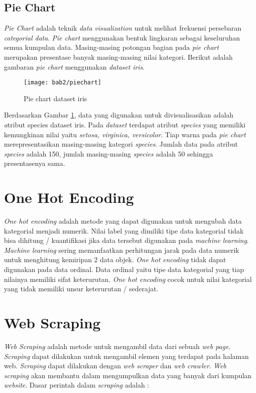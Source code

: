 \subsection{Pie Chart}
\textit{Pie Chart} adalah teknik \textit{data visualization} untuk melihat frekuensi persebaran \textit{categorial data}. \textit{Pie chart} menggunakan bentuk lingkaran sebagai keseluruhan semua kumpulan data. Masing-masing potongan bagian pada \textit{pie chart} merupakan presentase banyak masing-masing nilai kategori. Berikut adalah gambaran \textit{pie chart} menggunakan \textit{dataset iris}. 
	
	\begin{figure}[H]
		\centering  
		\texttt{[image: bab2/piechart]}   
		\caption{Pie chart dataset iris}
		\label{fig:piechart} 
	\end{figure}
	
Berdasarkan Gambar \ref{fig:piechart}, data yang digunakan untuk divisualisasikan adalah \textit atribut {species dataset iris}. Pada \textit{dataset} terdapat atribut \textit{species} yang memiliki kemungkinan nilai yaitu \textit{setosa, virginica, versicolor}. Tiap warna pada \textit{pie chart} merepresentasikan masing-masing kategori \textit{species}. Jumlah data pada atribut \textit{species} adalah 150, jumlah masing-masing \textit{species} adalah 50 sehingga presentasenya sama.

\section{One Hot Encoding \cite{tan_steinbach_karpatne_kumar_2020}}
\label{chap:teori_onehotencoding}
\textit{One hot encoding} adalah metode yang dapat digunakan untuk mengubah data kategorial menjadi numerik. Nilai label yang dimiliki tipe data kategorial tidak bisa dihitung / kuantifikasi jika data tersebut digunakan pada \textit{machine learning}. \textit{Machine learning} sering memanfaatkan perhitungan jarak pada data numerik untuk menghitung kemiripan 2 data objek. \textit{One hot encoding} tidak dapat digunakan pada data ordinal. Data ordinal yaitu tipe data kategorial yang tiap nilainya memiliki sifat keterurutan. \textit{One hot encoding} cocok untuk nilai kategorial yang tidak memiliki unsur keterurutan / sederajat.


\section{Web Scraping  \cite{manning_raghavan_schutze_2018}}
\textit{Web Scraping} adalah metode untuk mengambil data dari sebuah \textit{web page}. \textit{Scraping} dapat dilakukan untuk mengambil elemen yang terdapat pada halaman web. \textit{Scraping} dapat dilakukan dengan \textit{web scraper} dan \textit{web crawler}. \textit{Web scraping} akan membantu dalam mengumpulkan data yang banyak dari kumpulan \textit{website}. Dasar perintah dalam \textit{scraping} adalah :

